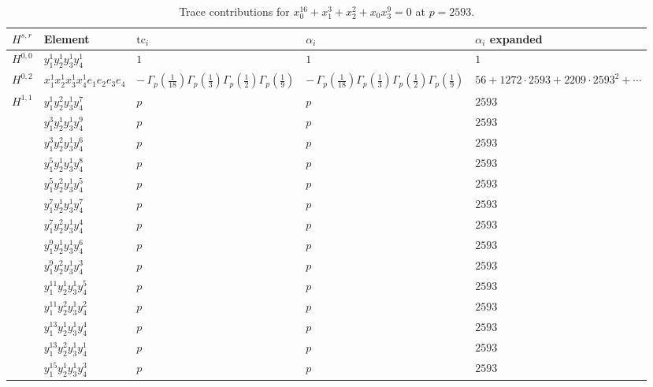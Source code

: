 \documentclass[11pt]{article}
\begin{document}
\begin{table}[ht]
\centering
\caption{Trace contributions for $x_0^{16} + x_1^{3} + x_2^{2} + x_0 x_3^{9} = 0$ at $p=2593$.}\label{tab:deformed-84}
\renewcommand{\arraystretch}{1.1}
{\scriptsize
\begin{tabular}{@{}lllll@{}}
\toprule
$H^{s,r}$ & Element & $\mathrm{tc}_i$ & $\alpha_i$ & $\alpha_i$ expanded \\
\midrule
$H^{0,0}$ & $y_{1}^{1} y_{2}^{1} y_{3}^{1} y_{4}^{1}$ & $1$ & $1$ & $1$ \\
\midrule
$H^{0,2}$ & $x_{1}^{1} x_{2}^{1} x_{3}^{1} x_{4}^{1}  e_{1} e_{2} e_{3} e_{4}$ & $- \, \Gamma_p \left( \frac{1}{18} \right) \Gamma_p \left( \frac{1}{3} \right) \Gamma_p \left( \frac{1}{2} \right) \Gamma_p \left( \frac{1}{9} \right)$ & $- \, \Gamma_p \left( \frac{1}{18} \right) \Gamma_p \left( \frac{1}{3} \right) \Gamma_p \left( \frac{1}{2} \right) \Gamma_p \left( \frac{1}{9} \right)$ & $56{+}1272{\cdot}2593{+}2209{\cdot}2593^{2}{+}\cdots$ \\
\midrule
$H^{1,1}$ & $y_{1}^{1} y_{2}^{2} y_{3}^{1} y_{4}^{7}$ & $p \,$ & $p \,$ & $2593$ \\
 & $y_{1}^{3} y_{2}^{1} y_{3}^{1} y_{4}^{9}$ & $p \,$ & $p \,$ & $2593$ \\
 & $y_{1}^{3} y_{2}^{2} y_{3}^{1} y_{4}^{6}$ & $p \,$ & $p \,$ & $2593$ \\
 & $y_{1}^{5} y_{2}^{1} y_{3}^{1} y_{4}^{8}$ & $p \,$ & $p \,$ & $2593$ \\
 & $y_{1}^{5} y_{2}^{2} y_{3}^{1} y_{4}^{5}$ & $p \,$ & $p \,$ & $2593$ \\
 & $y_{1}^{7} y_{2}^{1} y_{3}^{1} y_{4}^{7}$ & $p \,$ & $p \,$ & $2593$ \\
 & $y_{1}^{7} y_{2}^{2} y_{3}^{1} y_{4}^{4}$ & $p \,$ & $p \,$ & $2593$ \\
 & $y_{1}^{9} y_{2}^{1} y_{3}^{1} y_{4}^{6}$ & $p \,$ & $p \,$ & $2593$ \\
 & $y_{1}^{9} y_{2}^{2} y_{3}^{1} y_{4}^{3}$ & $p \,$ & $p \,$ & $2593$ \\
 & $y_{1}^{11} y_{2}^{1} y_{3}^{1} y_{4}^{5}$ & $p \,$ & $p \,$ & $2593$ \\
 & $y_{1}^{11} y_{2}^{2} y_{3}^{1} y_{4}^{2}$ & $p \,$ & $p \,$ & $2593$ \\
 & $y_{1}^{13} y_{2}^{1} y_{3}^{1} y_{4}^{4}$ & $p \,$ & $p \,$ & $2593$ \\
 & $y_{1}^{13} y_{2}^{2} y_{3}^{1} y_{4}^{1}$ & $p \,$ & $p \,$ & $2593$ \\
 & $y_{1}^{15} y_{2}^{1} y_{3}^{1} y_{4}^{3}$ & $p \,$ & $p \,$ & $2593$ \\

\end{tabular}}
\end{table}
\end{document}
